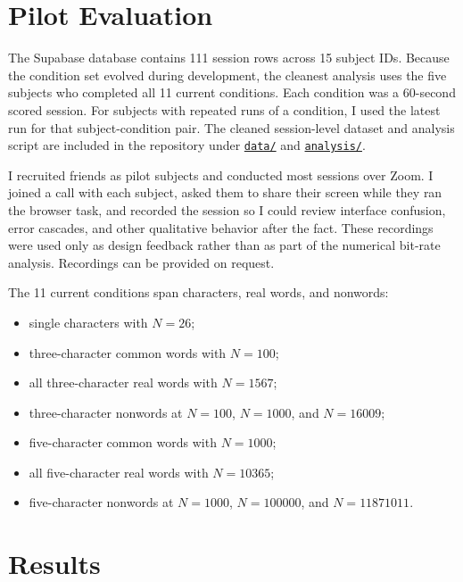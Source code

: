 \documentclass[11pt]{article}
\begin{document}
\section{Pilot Evaluation}

The Supabase database contains 111 session rows across 15 subject IDs. Because the condition set evolved during development, the cleanest analysis uses the five subjects who completed all 11 current conditions. Each condition was a 60-second scored session. For subjects with repeated runs of a condition, I used the latest run for that subject-condition pair. The cleaned session-level dataset and analysis script are included in the repository under \href{https://github.com/allensu02/sciencetakehome/tree/main/data}{\texttt{data/}} and \href{https://github.com/allensu02/sciencetakehome/tree/main/analysis}{\texttt{analysis/}}.

I recruited friends as pilot subjects and conducted most sessions over Zoom. I joined a call with each subject, asked them to share their screen while they ran the browser task, and recorded the session so I could review interface confusion, error cascades, and other qualitative behavior after the fact. These recordings were used only as design feedback rather than as part of the numerical bit-rate analysis. Recordings can be provided on request.

\begin{samepage}
The 11 current conditions span characters, real words, and nonwords:
\begin{itemize}
  \item single characters with \(N=26\);
  \item three-character common words with \(N=100\);
  \item all three-character real words with \(N=1567\);
  \item three-character nonwords at \(N=100\), \(N=1000\), and \(N=16009\);
  \item five-character common words with \(N=1000\);
  \item all five-character real words with \(N=10365\);
  \item five-character nonwords at \(N=1000\), \(N=100000\), and \(N=11871011\).
\end{itemize}
\end{samepage}

\section{Results}
\end{document}
